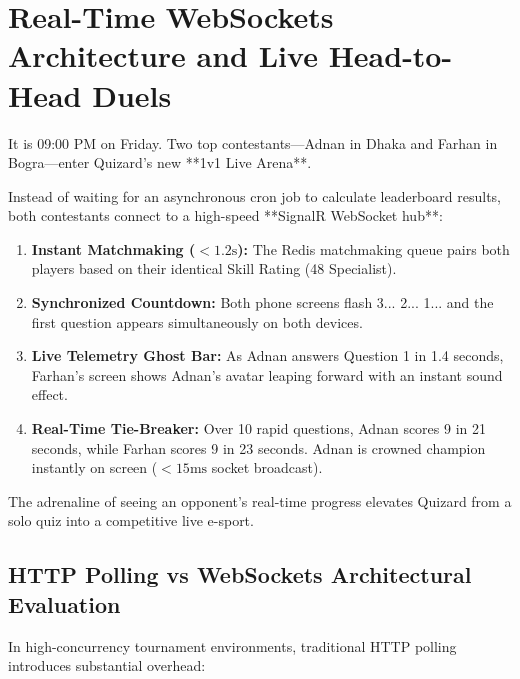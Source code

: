 \chapter{Real-Time WebSockets Architecture and Live Head-to-Head Duels}

\begin{tcolorbox}[storybox, title={The Story of the Live Friday Night Showdown}]
It is 09:00 PM on Friday. Two top contestants—Adnan in Dhaka and Farhan in Bogra—enter Quizard's new **1v1 Live Arena**.

Instead of waiting for an asynchronous cron job to calculate leaderboard results, both contestants connect to a high-speed **SignalR WebSocket hub**:
\begin{enumerate}
    \item \textbf{Instant Matchmaking ($< 1.2\text{s}$):} The Redis matchmaking queue pairs both players based on their identical Skill Rating (48 Specialist).
    \item \textbf{Synchronized Countdown:} Both phone screens flash 3... 2... 1... and the first question appears simultaneously on both devices.
    \item \textbf{Live Telemetry Ghost Bar:} As Adnan answers Question 1 in 1.4 seconds, Farhan's screen shows Adnan's avatar leaping forward with an instant sound effect.
    \item \textbf{Real-Time Tie-Breaker:} Over 10 rapid questions, Adnan scores 9 in 21 seconds, while Farhan scores 9 in 23 seconds. Adnan is crowned champion instantly on screen ($< 15\text{ms}$ socket broadcast).
\end{enumerate}
The adrenaline of seeing an opponent's real-time progress elevates Quizard from a solo quiz into a competitive live e-sport.
\end{tcolorbox}

\section{HTTP Polling vs WebSockets Architectural Evaluation}
In high-concurrency tournament environments, traditional HTTP polling introduces substantial overhead:


